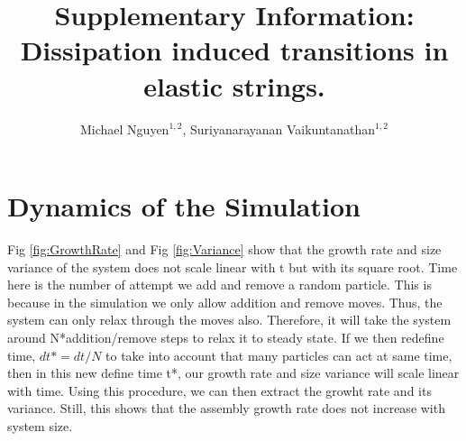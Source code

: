 \documentclass[amsmath,preprintnumbers,10pt,nofootinbib,prl,twocolumn]{revtex4-1}
\begin{document}
\title{Supplementary Information: Dissipation induced transitions in elastic strings.}
\author{Michael Nguyen$^{1,2}$, Suriyanarayanan Vaikuntanathan$^{1,2}$} 
\maketitle
\section{Dynamics of the Simulation}
Fig \ref{fig:GrowthRate} and Fig \ref{fig:Variance} show that the growth rate and size variance of the system does not scale linear with t but with its square root. Time here is the number of attempt we add and remove a random particle. This is because in the simulation we only allow addition and remove moves. Thus, the system can only relax through the moves also. Therefore, it will take the system around N*addition/remove steps to relax it to steady state. If we then redefine time, $dt\text{*} = dt/N$ to take into account that many particles can act at same time, then in this new define time t*, our growth rate and size variance will scale linear with time. Using this procedure, we can then extract the growht rate and its variance. Still, this shows that the assembly growth rate does not increase with system size.
\end{document}
